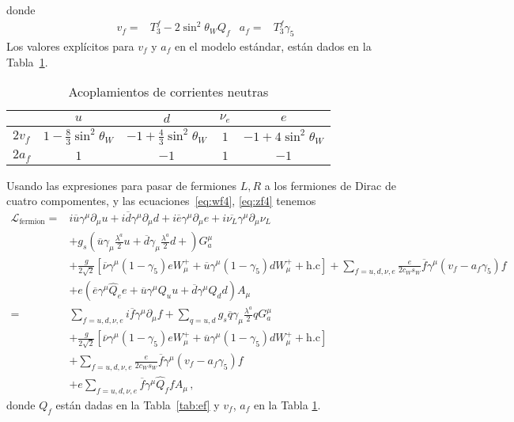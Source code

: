 \begin{itemize}
donde
\begin{align}
\label{eq:vfaf}
  v_f=&T_3^f-2 \sin^2\theta_WQ_f & a_f=&T_3^f \gamma_5
\end{align}
Los valores explícitos para  $v_f$ y $a_f$ en el modelo estándar, están dados en la Tabla~\ref{tab:zcoup}. 
\end{itemize}


\begin{table}  %
  \centering %
  \begin{tabular}{l|c|c|c|c} %
   &$u$&$d$&$\nu_e$&$e$\\\hline{}
$2v_f$&$1-\frac{8}{3}\sin^2\theta_W$&$-1+\frac{4}{3}\sin^2\theta_W$&$1$&$-1+4\sin^2\theta_W$\\
$2a_f$&$1$&$-1$&$1$&$-1$\\
  \end{tabular} %
  \caption{Acoplamientos de corrientes neutras} %
\label{tab:zcoup}
\end{table} %


Usando las expresiones para pasar de fermiones $L,R$ a los fermiones de Dirac de cuatro compomentes, y las ecuaciones~\eqref{eq:wf4}, \eqref{eq:zf4} tenemos
\begin{align}
\label{eq:lfermionfin}
   \mathcal{L}_{\text{fermion}}
  =&i\overline{u}\gamma^\mu\partial_\mu u+i\overline{d}\gamma^\mu\partial_\mu d+i\overline{e}\gamma^\mu{\partial}_\mu e
+i\overline{\nu_L}\gamma^\mu{\partial}_\mu \nu_L\nonumber\\
&+g_s \left(\overline{u}\gamma_\mu\frac{\lambda^a}{2}u
+\overline{d}\gamma_\mu\frac{\lambda^a}{2}d+ \right)G^\mu_a\nonumber\\
&+\frac{g}{2\sqrt{2}}\left[\overline{\nu}\gamma^\mu(1-\gamma_5)eW_\mu^++
\overline{u}\gamma^\mu(1-\gamma_5)d W_\mu^++\text{h.c}\right]
+\sum_{f=u,d,\nu,e}\frac{e}{2c_W s_W}\overline{f}\gamma^\mu\left(v_f-a_f\gamma_5\right)f\nonumber\\
&+e\left(\overline{e}\gamma^\mu \widehat{Q}_e e+
\overline{u}\gamma^\mu {Q}_u u+
\overline{d}\gamma^\mu {Q}_d d\right) A_\mu\nonumber\\
    =&\sum_{f=u,d,\nu,e}i\overline{f}\gamma^\mu\partial_\mu f+\sum_{q=u,d}g_s\overline{q}\gamma_\mu\frac{\lambda^a}{2}qG^\mu_a\nonumber\\
&+\frac{g}{2\sqrt{2}}\left[\overline{\nu}\gamma^\mu(1-\gamma_5)eW_\mu^++
\overline{u}\gamma^\mu(1-\gamma_5)d W_\mu^++\text{h.c}\right]\nonumber\\
&+\sum_{f=u,d,\nu,e}\frac{e}{2c_W s_W}\overline{f}\gamma^\mu\left(v_f-a_f\gamma_5\right)f\nonumber\\
&+e\sum_{f=u,d,\nu,e}\overline{f}\gamma^\mu \widehat{Q}_f f A_\mu\,,
\end{align}
donde $Q_f$ están dadas en la Tabla~\ref{tab:ef} y $v_f$, $a_f$ en la Tabla \ref{tab:zcoup}.





